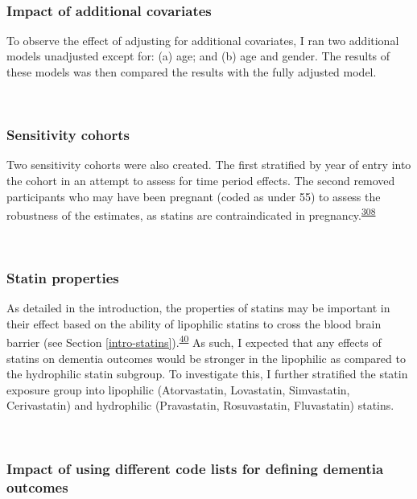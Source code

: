 \documentclass[a4paper, twoside]{templates/ociamthesis}
\begin{document}
~

\hypertarget{impact-of-additional-covariates}{%
\subsubsection{Impact of additional covariates}\label{impact-of-additional-covariates}}

To observe the effect of adjusting for additional covariates, I ran two additional models unadjusted except for: (a) age; and (b) age and gender. The results of these models was then compared the results with the fully adjusted model.

~

\hypertarget{sensitivity-cohorts}{%
\subsubsection{Sensitivity cohorts}\label{sensitivity-cohorts}}

Two sensitivity cohorts were also created. The first stratified by year of entry into the cohort in an attempt to assess for time period effects. The second removed participants who may have been pregnant (coded as under 55) to assess the robustness of the estimates, as statins are contraindicated in pregnancy.\textsuperscript{\protect\hyperlink{ref-karalis2016}{308}}

~

\hypertarget{statin-properties}{%
\subsubsection{Statin properties}\label{statin-properties}}

As detailed in the introduction, the properties of statins may be important in their effect based on the ability of lipophilic statins to cross the blood brain barrier (see Section \ref{intro-statins}).\textsuperscript{\protect\hyperlink{ref-sierra2011}{40}} As such, I expected that any effects of statins on dementia outcomes would be stronger in the lipophilic as compared to the hydrophilic statin subgroup. To investigate this, I further stratified the statin exposure group into lipophilic (Atorvastatin, Lovastatin, Simvastatin, Cerivastatin) and hydrophilic (Pravastatin, Rosuvastatin, Fluvastatin) statins.

~

\hypertarget{impact-of-using-different-code-lists-for-defining-dementia-outcomes}{%
\subsubsection{Impact of using different code lists for defining dementia outcomes}\label{impact-of-using-different-code-lists-for-defining-dementia-outcomes}}
\end{document}
